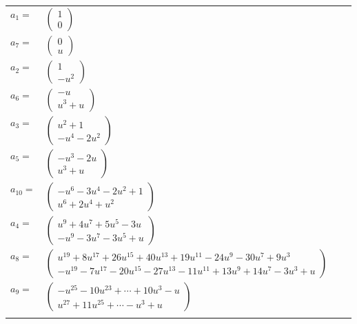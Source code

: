 \documentclass[1p]{elsarticle_modified}
\theoremstyle{definition}
\begin{document}
\begin{tabular}{m{7pt} m{180pt} m{7pt} m{180pt} }
\flushright $a_{1}=$&$\begin{pmatrix}1\\0\end{pmatrix}$ \\
\flushright $a_{7}=$&$\begin{pmatrix}0\\u\end{pmatrix}$ \\
\flushright $a_{2}=$&$\begin{pmatrix}1\\- u^2\end{pmatrix}$ \\
\flushright $a_{6}=$&$\begin{pmatrix}- u\\u^3+u\end{pmatrix}$ \\
\flushright $a_{3}=$&$\begin{pmatrix}u^2+1\\- u^4-2 u^2\end{pmatrix}$ \\
\flushright $a_{5}=$&$\begin{pmatrix}- u^3-2 u\\u^3+u\end{pmatrix}$ \\
\flushright $a_{10}=$&$\begin{pmatrix}- u^6-3 u^4-2 u^2+1\\u^6+2 u^4+u^2\end{pmatrix}$ \\
\flushright $a_{4}=$&$\begin{pmatrix}u^9+4 u^7+5 u^5-3 u\\- u^9-3 u^7-3 u^5+u\end{pmatrix}$ \\
\flushright $a_{8}=$&$\begin{pmatrix}u^{19}+8 u^{17}+26 u^{15}+40 u^{13}+19 u^{11}-24 u^9-30 u^7+9 u^3\\- u^{19}-7 u^{17}-20 u^{15}-27 u^{13}-11 u^{11}+13 u^9+14 u^7-3 u^3+u\end{pmatrix}$ \\
\flushright $a_{9}=$&$\begin{pmatrix}- u^{25}-10 u^{23}+\cdots+10 u^3- u\\u^{27}+11 u^{25}+\cdots- u^3+u\end{pmatrix}$\\&\end{tabular}
\end{document}
